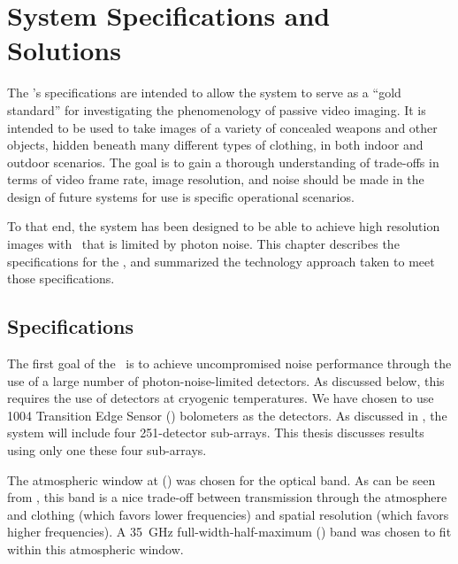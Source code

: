 \chapter{System Specifications and Solutions}\label{c:specs}

The \Imager's specifications are intended to allow the system to serve as a ``gold standard'' for investigating the phenomenology of passive video imaging.
It is intended to be used to take images of a variety of concealed weapons and other objects, hidden beneath many different types of clothing, in both indoor and outdoor scenarios.
The goal is to gain a thorough understanding of trade-offs in terms of video frame rate, image resolution, and noise should be made in the design of future systems for use is specific operational scenarios.

To that end, the system has been designed to be able to achieve high resolution images with \NETD\ that is limited by photon noise.
This chapter describes the specifications for the \Imager, and summarized the technology approach taken to meet those specifications.

\section{Specifications} \label{sec:ch2-specifications}

The first goal of the \Imager\ is to achieve uncompromised noise performance through the use of a large number of photon-noise-limited detectors.
As discussed below, this requires the use of detectors at cryogenic temperatures.
We have chosen to use 1004 Transition Edge Sensor (\TES) bolometers as the detectors.
As discussed in , the system will include four 251-detector sub-arrays.
This thesis discusses results using only one these four sub-arrays.

The atmospheric window at  () was chosen for the optical band.
As can be seen from , this band is a nice trade-off between transmission through the atmosphere and clothing (which favors lower frequencies) and spatial resolution (which favors higher frequencies).
A \SI{35}{\GHz} full-width-half-maximum (\FWHM) band was chosen to fit within this atmospheric window.

